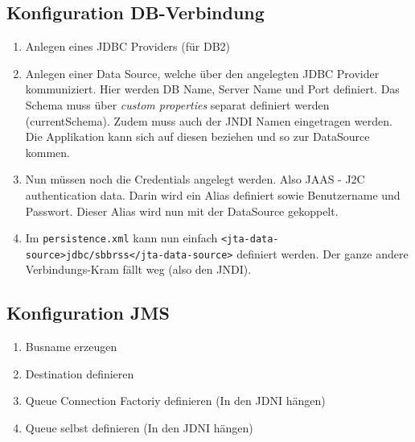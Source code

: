 \subsection{Konfiguration DB-Verbindung}
\begin{enumerate}
	\item Anlegen eines JDBC Providers (für DB2)
	\item Anlegen einer Data Source, welche über den angelegten JDBC Provider kommuniziert. Hier werden DB Name, Server Name und Port definiert. Das Schema muss über \emph{custom properties} separat definiert werden (currentSchema). Zudem muss auch der JNDI Namen eingetragen werden. Die Applikation kann sich auf diesen beziehen und so zur DataSource kommen.
	\item Nun müssen noch die Credentials angelegt werden. Also JAAS - J2C authentication data. Darin wird ein Alias definiert sowie Benutzername und Passwort. Dieser Alias wird nun mit der DataSource gekoppelt.
	\item Im \verb|persistence.xml| kann nun einfach \verb|<jta-data-source>jdbc/sbbrss</jta-data-source>| definiert werden. Der ganze andere Verbindungs-Kram fällt weg (also den JNDI).
\end{enumerate}

\subsection{Konfiguration JMS}
\begin{enumerate}
	\item Busname erzeugen
	\item Destination definieren
	\item Queue Connection Factoriy definieren (In den JDNI hängen)
	\item Queue selbst definieren (In den JDNI hängen)
\end{enumerate}